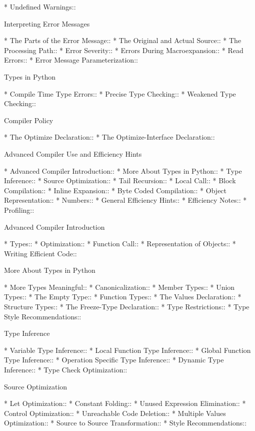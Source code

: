 \begin{menu}
* Undefined Warnings::          

Interpreting Error Messages

* The Parts of the Error Message::  
* The Original and Actual Source::  
* The Processing Path::         
* Error Severity::              
* Errors During Macroexpansion::  
* Read Errors::                 
* Error Message Parameterization::  

Types in Python

* Compile Time Type Errors::    
* Precise Type Checking::       
* Weakened Type Checking::      

Compiler Policy

* The Optimize Declaration::    
* The Optimize-Interface Declaration::  

Advanced Compiler Use and Efficiency Hints

* Advanced Compiler Introduction::  
* More About Types in Python::  
* Type Inference::              
* Source Optimization::         
* Tail Recursion::              
* Local Call::                  
* Block Compilation::           
* Inline Expansion::            
* Byte Coded Compilation::      
* Object Representation::       
* Numbers::                     
* General Efficiency Hints::    
* Efficiency Notes::            
* Profiling::                   

Advanced Compiler Introduction

* Types::                       
* Optimization::                
* Function Call::               
* Representation of Objects::   
* Writing Efficient Code::      

More About Types in Python

* More Types Meaningful::       
* Canonicalization::            
* Member Types::                
* Union Types::                 
* The Empty Type::              
* Function Types::              
* The Values Declaration::      
* Structure Types::             
* The Freeze-Type Declaration::  
* Type Restrictions::           
* Type Style Recommendations::  

Type Inference

* Variable Type Inference::     
* Local Function Type Inference::  
* Global Function Type Inference::  
* Operation Specific Type Inference::  
* Dynamic Type Inference::      
* Type Check Optimization::     

Source Optimization

* Let Optimization::            
* Constant Folding::            
* Unused Expression Elimination::  
* Control Optimization::        
* Unreachable Code Deletion::   
* Multiple Values Optimization::  
* Source to Source Transformation::  
* Style Recommendations::       


\end{menu}

